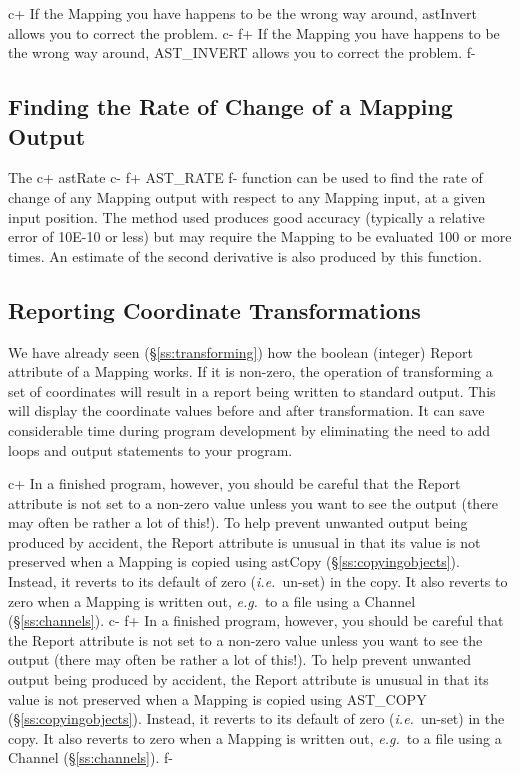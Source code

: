 \documentclass[twoside,11pt]{starlink}
\providecommand{\secref}[1]{\S\ref{#1}}
\begin{document}
c+
If the Mapping you have happens to be the wrong way around, astInvert
allows you to correct the problem.
c-
f+
If the Mapping you have happens to be the wrong way around,
AST\_INVERT allows you to correct the problem.
f-

\subsection{Finding the Rate of Change of a Mapping Output}
The
c+
astRate
c-
f+
AST\_RATE
f-
function can be used to find the rate of change of any Mapping output
with respect to any Mapping input, at a given input position. The method
used produces good accuracy (typically a relative error of 10E-10 or
less) but may require the Mapping to be evaluated 100 or more times.
An estimate of the second derivative is also produced by this function.


\subsection{Reporting Coordinate Transformations}

We have already seen (\secref{ss:transforming}) how the boolean
(integer) Report attribute of a Mapping works. If it is non-zero, the
operation of transforming a set of coordinates will result in a report
being written to standard output. This will display the coordinate
values before and after transformation. It can save considerable time
during program development by eliminating the need to add loops and
output statements to your program.

c+
In a finished program, however, you should be careful that the Report
attribute is not set to a non-zero value unless you want to see the
output (there may often be rather a lot of this!). To help prevent
unwanted output being produced by accident, the Report attribute is
unusual in that its value is not preserved when a Mapping is copied
using astCopy (\secref{ss:copyingobjects}). Instead, it reverts to its
default of zero (\emph{i.e.}\ un-set) in the copy. It also reverts to
zero when a Mapping is written out, \emph{e.g.}\ to a file using a
Channel (\secref{ss:channels}).
c-
f+
In a finished program, however, you should be careful that the Report
attribute is not set to a non-zero value unless you want to see the
output (there may often be rather a lot of this!). To help prevent
unwanted output being produced by accident, the Report attribute is
unusual in that its value is not preserved when a Mapping is copied
using AST\_COPY (\secref{ss:copyingobjects}). Instead, it reverts to
its default of zero (\emph{i.e.}\ un-set) in the copy. It also reverts
to zero when a Mapping is written out, \emph{e.g.}\ to a file using a
Channel (\secref{ss:channels}).
f-
\end{document}
